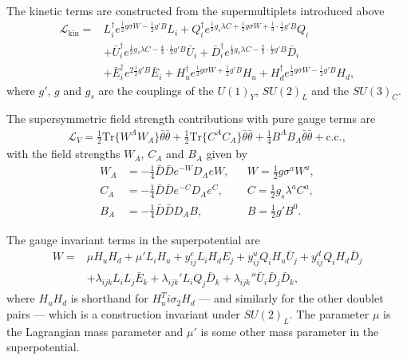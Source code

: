 \documentclass[twoside,english]{uiofysmaster}
\begin{document}
{The kinetic terms are constructed from the supermultiplets introduced above
\begin{align}
\mathcal{L}_{\text{kin}} =& L_i^{\dagger} e^{\frac{1}{2}g \sigma W - \frac{1}{2}g'B} L_i + Q_i^{\dagger} e^{\frac{1}{2}g_s \lambda C+ \frac{1}{2} g \sigma W + \frac{1}{3} \cdot \frac{1}{2} g' B} Q_i \nonumber \\
&+ \bar{U}_i^{\dagger} e^{\frac{1}{2}g_s \lambda C - \frac{4}{3} \cdot \frac{1}{2} g' B} \bar{U}_i + \bar{D}_i^{\dagger} e^{\frac{1}{2}g_s \lambda C - \frac{2}{3} \cdot \frac{1}{2} g' B} \bar{D}_i \nonumber \\
&+ \bar{E}_i^{\dagger} e^{2 \frac{1}{2}g'B} \bar{E}_i + H_u^{\dagger} e^{\frac{1}{2} g \sigma W + \frac{1}{2} g'B} H_u + H_d^{\dagger} e^{\frac{1}{2} g \sigma W - \frac{1}{2} g'B} H_d,
\end{align}
where $g'$, $g$ and $g_s$ are the couplings of the $U(1)_Y$, $SU(2)_L$ and the $SU(3)_C$. 

The supersymmetric field strength contributions with pure gauge terms are
\begin{align}
\mathcal{L}_V = \frac{1}{2} \text{Tr} \big \{ W^AW_A \big \} \bar{\theta} \bar{\theta} + \frac{1}{2} \text{Tr} \big \{ C^AC_A \big \} \bar{\theta} \bar{\theta} + \frac{1}{4} B^AB_A \bar{\theta} \bar{\theta} + \text{c.c.},
\end{align}
with the field strengths $W_A$, $C_A$ and $B_A$ given by
\begin{align}
W_A &= - \frac{1}{4} \bar{D} \bar{D} e^{-W}D_A eW, &&W = \frac{1}{2} g \sigma^a W^a,\\
C_A &= - \frac{1}{4} \bar{D} \bar{D} e^{-C} D_A e^C, &&C = \frac{1}{2} g_s\lambda^a C^a,\\
B_A &= - \frac{1}{4} \bar{D} \bar{D} D_A B, &&B = \frac{1}{2}g'B^0.
\end{align}

The gauge invariant terms in the superpotential are
\begin{align}
W =& \mu H_u H_d + \mu' L_i H_u + y_{ij}^e L_i H_d E_j + y_{ij}^u Q_i H_u \bar{U}_j + y_{ij}^d Q_i H_d \bar{D}_j \nonumber \\
&+ \lambda_{ijk} L_i L_j\bar{E}_k + \lambda_{ijk}' L_i Q_j \bar{D}_k + \lambda_{ijk}'' \bar{U}_i \bar{D}_j \bar{D}_k,
\end{align}
where $H_uH_d$ is shorthand for $H_u^T i \sigma_2 H_d$ --- and similarly for the other doublet pairs --- which is a construction invariant under $SU(2)_L$. The parameter $\mu$ is the Lagrangian mass parameter and $\mu'$ is some other mass parameter in the superpotential.
 

}
\end{document}

